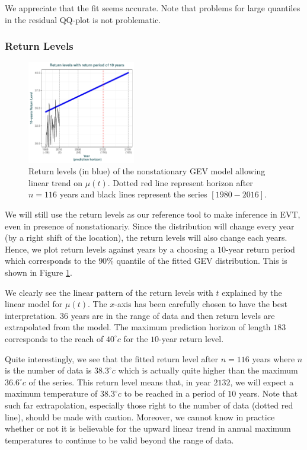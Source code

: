 We appreciate that the fit seems accurate. Note that problems for large quantiles in the residual QQ-plot is not problematic. 


\subsubsection*{Return Levels}



\begin{figure}
	\centering
	\includegraphics[width=0.42\textwidth]{rl_nsta.pdf} %
	\caption{Return levels (in blue) of the nonstationary GEV model allowing linear trend on $\mu(t)$. Dotted red line represent horizon after $n=116$ years and black lines represent the series $[1980-2016]$.  }
	\label{fig:rl_nsta}
\end{figure}

We will still use the return levels as our reference tool to make inference in EVT, even in presence of nonstationariy. Since the distribution will change every year (by a right shift of the location), the return levels will also change each years. Hence, we plot return levels against years by a choosing a $10$-year return period which corresponds to the $90\%$ quantile of the fitted GEV distribution. This is shown in Figure \ref{fig:rl_nsta}.

We clearly see the linear pattern of the return levels with $t$ explained by the linear model for $\mu(t)$. The $x$-axis has been carefully chosen to have the best interpretation. $36$ years are in the range of data and then return levels are extrapolated from the model. The maximum prediction horizon of length $183$ corresponds to the reach of $40^{\circ}c$ for the $10$-year return level. 

Quite interestingly, we see that the fitted return level after $n=116$ years where $n$ is the number of data is $38.3^{\circ}c$ which is actually quite higher than the maximum $36.6^{\circ}c$ of the series. 
This return level means that, in year $2132$, we will expect a maximum temperature of $38.3^{\circ}c$ to be reached in a period of $10$ years. Note that such far extrapolation, especially those right to the number of data (dotted red line), should be made with caution.
Moreover, we cannot know in practice whether or not it is believable
for the upward linear trend in annual maximum temperatures to continue to be valid beyond the range of data.

